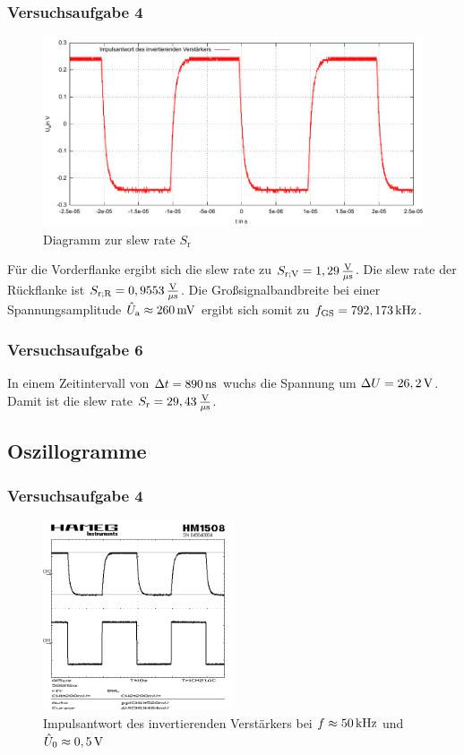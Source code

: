 \documentclass[numbers=noenddot,12pt,a4paper]{scrartcl}
\newcommand{\ix}[1]{_\text{#1}}
\begin{document}
\subsubsection{Versuchsaufgabe 4}
\begin{figure}[H]
\centering
\includegraphics[width=\textwidth]{aufg4.pdf}
\caption{Diagramm zur slew rate $S\ix{r}$} \label{img:aufg4}
\end{figure}
Für die Vorderflanke ergibt sich die slew rate zu $S\ix{r;V}=\unit[1,29]{\frac{V}{\mu s}}$. Die slew rate der Rückflanke ist $S\ix{r;R}=\unit[0,9553]{\frac{V}{\mu s}}$. Die Großsignalbandbreite bei einer Spannungsamplitude $\hat{U}\ix{a}\approx\unit[260]{mV}$ ergibt sich somit zu $f\ix{GS}=\unit[792,173]{kHz}$.
\subsubsection{Versuchsaufgabe 6}
In einem Zeitintervall von $\Delta t=\unit[890]{ns}$ wuchs die Spannung um $\Delta U=\unit[26,2]{V}$. Damit ist die slew rate $S\ix{r}=\unit[29,43]{\frac{V}{\mu s}}$.
\subsection{Oszillogramme}
\subsubsection{Versuchsaufgabe 4}
\begin{figure}[H]
\centering
\includegraphics[width=0.5\textwidth]{aufg4oszillo.png}
\caption{Impulsantwort des invertierenden Verstärkers bei $f\approx\unit[50]{kHz}$ und $\hat{U}_0\approx\unit[0,5]{V}$} \label{img:oszillo}
\end{figure}
\end{document}
